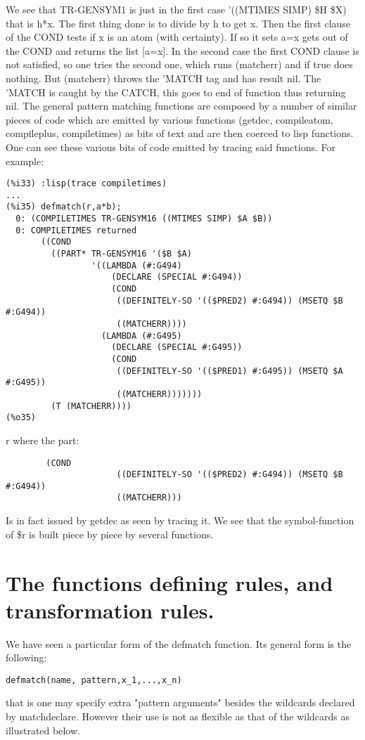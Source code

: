 \documentclass[a4paper,11pt]{article}
\begin{document}
We see that TR-GENSYM1 is just in the first case 
'((MTIMES SIMP) \$H \$X) that is h*x. The first thing done is to divide by
h to get x. Then the first clause of the COND tests if x is an atom (with
certainty). If so it sets a=x gets out of the COND and returns the list
[a=x]. In the second case the first COND clause is not satisfied, so one tries
the second one, which runs (matcherr) and if true does nothing. But (matcherr)
throws the 'MATCH tag and has result nil. The 'MATCH is caught by the CATCH,
this goes to end of function thus returning nil. The general pattern matching
functions are composed by a number of similar pieces of code which are emitted 
by various functions (getdec, compileatom, compileplus, compiletimes) as bits of text
and are then coerced to lisp functions. One can see these various bits of code emitted by
tracing said functions. For example:
\begin{verbatim}
(%i33) :lisp(trace compiletimes)
...
(%i35) defmatch(r,a*b);
  0: (COMPILETIMES TR-GENSYM16 ((MTIMES SIMP) $A $B))
  0: COMPILETIMES returned
       ((COND
         ((PART* TR-GENSYM16 '($B $A)
                 '((LAMBDA (#:G494)
                     (DECLARE (SPECIAL #:G494))
                     (COND
                      ((DEFINITELY-SO '(($PRED2) #:G494)) (MSETQ $B #:G494))
                      ((MATCHERR))))
                   (LAMBDA (#:G495)
                     (DECLARE (SPECIAL #:G495))
                     (COND
                      ((DEFINITELY-SO '(($PRED1) #:G495)) (MSETQ $A #:G495))
                      ((MATCHERR)))))))
         (T (MATCHERR))))
(%o35) 
\end{verbatim}                                r
where the part:
\begin{verbatim}
   	    (COND
                      ((DEFINITELY-SO '(($PRED2) #:G494)) (MSETQ $B #:G494))
                      ((MATCHERR)))
\end{verbatim}
Is in fact issued by getdec as seen by tracing it. We see that the symbol-function
of \$r is built piece by piece by several functions.


\section{The functions defining rules, and transformation rules.}


We have seen a particular form of the defmatch function.  Its general
form is the following:

\begin{verbatim}
defmatch(name, pattern,x_1,...,x_n) 
\end{verbatim}
that is one may specify extra "pattern arguments" besides the
wildcards declared by matchdeclare. However their use is not as
flexible as that of the wildcards as illustrated below.
\end{document}
